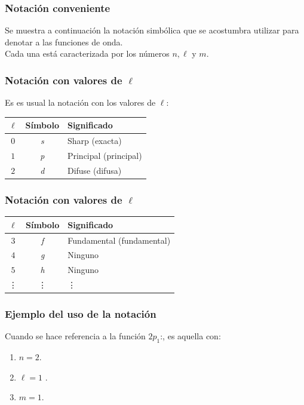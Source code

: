 \documentclass[12pt]{beamer}
\begin{document}
\begin{frame}
\frametitle{Notación conveniente}
Se muestra a continuación la notación simbólica que se acostumbra utilizar para denotar a las funciones de onda.
\\
\bigskip
\pause
Cada una está caracterizada por los números $n, \ell$ y $m$.
\end{frame}
\begin{frame}
\frametitle{Notación con valores de $\ell$}
Es es usual la notación con los valores de $\ell$:
\pause
\begin{table}
\centering
\begin{tabular}{|c | c | l|} \hline
$\ell$ & Símbolo & Significado \\ \hline
$0$ & \emph{s} & Sharp (exacta) \\ \hline
$1$ & \emph{p} & Principal (principal) \\ \hline
$2$ & \emph{d} & Difuse (difusa) \\ \hline
\end{tabular}
\label{table:Tabla_valores_l}
\end{table}
\end{frame}
\begin{frame}
\frametitle{Notación con valores de $\ell$}
\begin{table}
\centering
\begin{tabular}{|c | c | l|} \hline
$\ell$ & Símbolo & Significado \\ \hline    
$3$ & \emph{f} & Fundamental (fundamental) \\ \hline
$4$ & \emph{g} & Ninguno \\ \hline
$5$ & \emph{h} & Ninguno \\ \hline
\vdots & \vdots & \vdots \\ \hline    
\end{tabular}
\end{table}
\end{frame}
\begin{frame}
\frametitle{Ejemplo del uso de la notación}
Cuando se hace referencia a la función $2 p_{1}$:, es aquella con:
\begin{enumerate}[<+->]
\item $n = 2$.
\item $\ell = 1$ .
\item $m = 1$.
\end{enumerate}
\end{frame}
\end{document}

